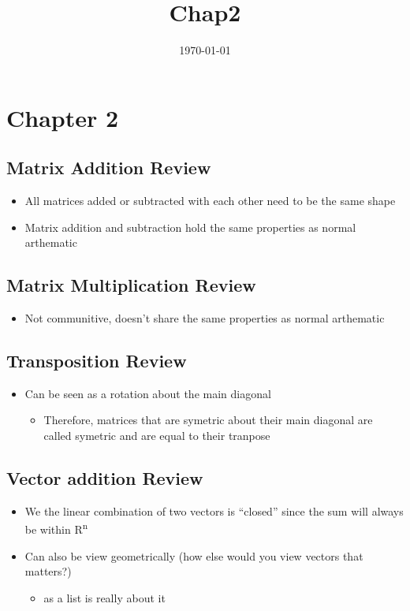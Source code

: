 \documentclass[11pt]{article}
\date{\today}
\title{Chap2}
\begin{document}
\maketitle
\tableofcontents

\section{Chapter 2}
\label{sec:org3fd77da}
\subsection{Matrix Addition Review}
\label{sec:orgb4f2b22}
\begin{itemize}
\item All matrices added or subtracted with each other need to be the same shape
\item Matrix addition and subtraction hold the same properties as normal arthematic
\end{itemize}
\subsection{Matrix Multiplication Review}
\label{sec:org5f3e107}
\begin{itemize}
\item Not communitive, doesn't share the same properties as normal arthematic
\end{itemize}
\subsection{Transposition Review}
\label{sec:org36926c7}
\begin{itemize}
\item Can be seen as a rotation about the main diagonal
\begin{itemize}
\item Therefore, matrices that are symetric about their main diagonal are called symetric and are equal to their tranpose
\end{itemize}
\end{itemize}
\subsection{Vector addition Review}
\label{sec:org5a50211}
\begin{itemize}
\item We the linear combination of two vectors is ``closed'' since the sum will always be within R\textsuperscript{n}
\item Can also be view geometrically (how else would you view vectors that matters?)
\begin{itemize}
\item as a list is really about it
\end{itemize}
\end{itemize}
\end{document}
